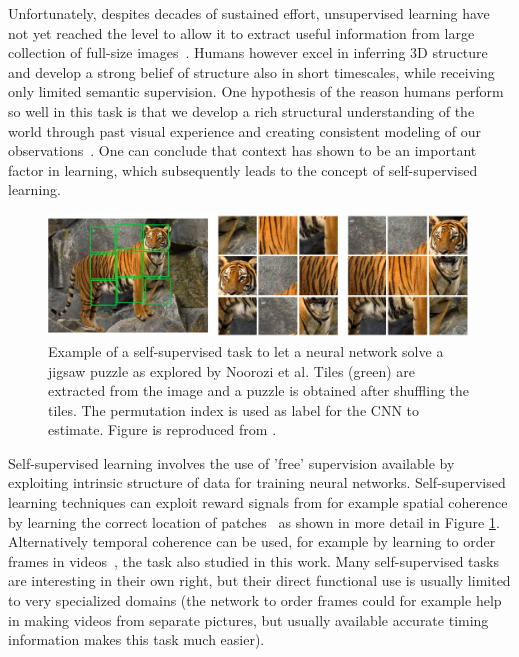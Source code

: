 Unfortunately, despites decades of sustained effort, unsupervised learning have not yet reached the level to allow it to extract useful information from large collection of full-size images~\cite{doersch2015}. Humans however excel in inferring 3D structure and develop a strong belief of structure also in short timescales, while receiving only limited semantic supervision. One hypothesis of the reason humans perform so well in this task is that we develop a rich structural understanding of the world through past visual experience and creating consistent modeling of our observations~\cite{zhou2017}. One can conclude that context has shown to be an important factor in learning, which subsequently leads to the concept of self-supervised learning.

\begin{figure}[t]
\centering
\includegraphics[width=\textwidth]{images/jigsaw_puzzle.png}
\caption{Example of a self-supervised task to let a neural network solve a jigsaw puzzle as explored by Noorozi et al\cite{noroozi2016}. Tiles (green) are extracted from the image and a puzzle is obtained after shuffling the tiles. The permutation index is used as label for the CNN to estimate. Figure is reproduced from \cite{noroozi2016}.}
\label{fig:jigsaw}
\end{figure}

Self-supervised learning involves the use of 'free' supervision available by exploiting intrinsic structure of data for training neural networks. Self-supervised learning techniques can exploit reward signals from for example spatial coherence by learning the correct location of patches~\cite{doersch2015, noroozi2016} as shown in more detail in Figure \ref{fig:jigsaw}. Alternatively temporal coherence can be used, for example by learning to order frames in videos~\cite{misra2016, lee2017}, the task also studied in this work. Many self-supervised tasks are interesting in their own right, but their direct functional use is usually limited to very specialized domains (the network to order frames could for example help in making videos from separate pictures, but usually available accurate timing information makes this task much easier).

